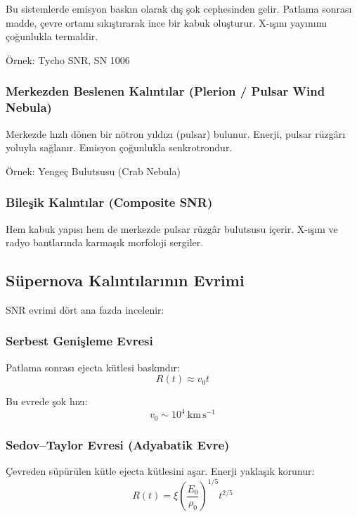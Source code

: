 Bu sistemlerde emisyon baskın olarak dış şok cephesinden gelir. Patlama sonrası madde, çevre ortamı sıkıştırarak ince bir kabuk oluşturur. X-ışını yayınımı çoğunlukla termaldir.

Örnek: Tycho SNR, SN 1006

\subsubsection{Merkezden Beslenen Kalıntılar (Plerion / Pulsar Wind Nebula)}

Merkezde hızlı dönen bir nötron yıldızı (pulsar) bulunur. Enerji, pulsar rüzgârı yoluyla sağlanır. Emisyon çoğunlukla senkrotrondur.

Örnek: Yengeç Bulutsusu (Crab Nebula)

\subsubsection{Bileşik Kalıntılar (Composite SNR)}

Hem kabuk yapısı hem de merkezde pulsar rüzgâr bulutsusu içerir. X-ışını ve radyo bantlarında karmaşık morfoloji sergiler.

\subsection{Süpernova Kalıntılarının Evrimi}

SNR evrimi dört ana fazda incelenir:

\subsubsection{Serbest Genişleme Evresi}

Patlama sonrası ejecta kütlesi baskındır:
\begin{equation}
R(t) \approx v_0 t
\end{equation}

Bu evrede şok hızı:
\begin{equation}
v_0 \sim 10^4\ \mathrm{km\,s^{-1}}
\end{equation}

\subsubsection{Sedov--Taylor Evresi (Adyabatik Evre)}

Çevreden süpürülen kütle ejecta kütlesini aşar. Enerji yaklaşık korunur:
\begin{equation}
R(t) = \xi \left(\frac{E_0}{\rho_0}\right)^{1/5} t^{2/5}
\end{equation}

